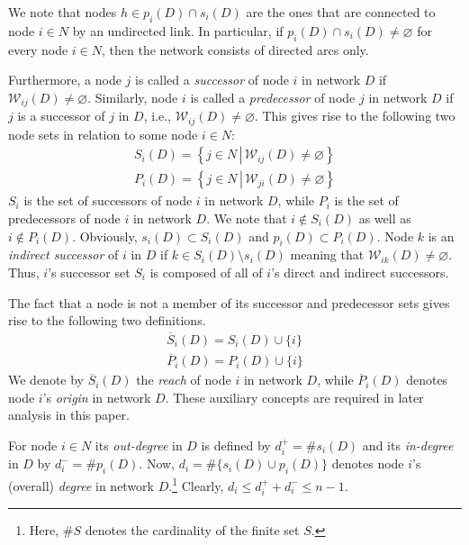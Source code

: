 \documentclass[11pt,fleqn]{article}
\begin{document}
We note that nodes $h \in p_i (D) \cap s_i (D)$ are the ones that are connected to node $i \in N$ by an undirected link. In particular, if $p_i (D) \cap s_i (D) \neq \varnothing$ for every node $i \in N$, then the network consists of directed arcs only.

Furthermore, a node $j$ is called a \emph{successor} of node $i$ in network $D$ if $\mathcal{W}_{ij} (D) \neq \varnothing$. Similarly, node $i$ is called a \textit{predecessor} of node $j$ in network $D$ if $j$ is a successor of $j$ in $D$, i.e., $\mathcal{W}_{ij} (D) \neq \varnothing$. This gives rise to the following two node sets in relation to some node $i \in N \colon$
\begin{gather}
	S_i (D)= \left\{ j \in N \, \left| \, \mathcal{W}_{ij}(D) \neq \varnothing \right. \right\} \\[1.5ex]
	P_i (D)= \left\{ j \in N \, \left| \, \mathcal{W}_{ji}(D) \neq \varnothing \right. \right\}
\end{gather}
$S_i$ is the set of successors of node $i$ in network $D$, while $P_i$ is the set of predecessors of node $i$ in network $D$. We note that $i \notin S_i(D)$ as well as $i \notin P_i (D)$. Obviously, $s_i (D) \subset S_i (D)$ and $p_i (D) \subset P_i (D)$. Node $k$ is an \emph{indirect successor} of $i$ in $D$ if $k \in S_{i}(D) \setminus s_i (D)$ meaning that $\mathcal{W}_{ik}(D) \neq \varnothing$. Thus, $i$'s successor set $S_i$ is composed of all of $i$'s direct and indirect successors.

The fact that a node is not a member of its successor and predecessor sets gives rise to the following two definitions.
\begin{gather}
	\overline{S}_{i}(D) = S_{i}(D) \cup \{i\} \\[1.5ex]
	\overline{P}_{i}(D) = P_{i}(D) \cup \{i\}
\end{gather}
We denote by $\overline{S}_{i}(D)$ the \emph{reach} of node $i$ in network $D$, while $\overline{P}_{i}(D)$ denotes node $i$'s \emph{origin} in network $D$. These auxiliary concepts are required in later analysis in this paper.

For node $i \in N$ its \emph{out-degree} in $D$ is defined by $d_{i}^{+} = \# s_{i}(D)$ and its \emph{in-degree} in $D$ by $d_{i}^{-}= \# p_{i}(D)$. Now, $d_{i} = \# \{ s_{i} (D) \cup p_{i} (D) \}$ denotes node $i$'s (overall) \emph{degree} in network $D$.\footnote{Here, $\# S$ denotes the cardinality of the finite set $S$.} Clearly, $d_i \leqslant d_i^+ + d_i^- \leqslant n-1$.
\end{document}
